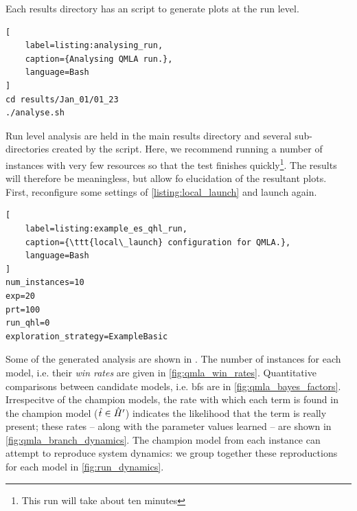 Each results directory has an  script to generate plots at the \gls{run} level. 
\begin{lstlisting}[
    label=listing:analysing_run,
    caption={Analysing QMLA run.},
    language=Bash
]
cd results/Jan_01/01_23
./analyse.sh
\end{lstlisting}

Run level analysis are held in the main results directory and several sub-directories created by the  script. 
Here, we recommend running a number of instances with very few resources so that the test finishes quickly\footnote{This run will take about ten minutes}. 
The results will therefore be meaningless, but allow fo elucidation of the resultant plots. 
First, reconfigure some settings of \cref{listing:local_launch} and launch again.
\begin{lstlisting}[
    label=listing:example_es_qhl_run,
    caption={\ttt{local\_launch} configuration for QMLA.},
    language=Bash
]
num_instances=10
exp=20
prt=100
run_qhl=0
exploration_strategy=ExampleBasic
\end{lstlisting}
\par 

Some of the generated analysis are shown in . 
The number of instances for each model, i.e. their \emph{\glspl{win rate}} are given in \cref{fig:qmla_win_rates}.
Quantitative comparisons between candidate models, i.e. \glspl{bf} are in \cref{fig:qmla_bayes_factors}.
Irrespecitve of the champion models, the rate with which each term is found in the champion model ($\hat{t} \in \hat{H}^{\prime}$)
    indicates the likelihood that the term is really present;
    these rates -- along with the parameter values learned -- are shown in \cref{fig:qmla_branch_dynamics}.
The champion model from each instance can attempt to reproduce system dynamics: 
    we group together these reproductions for each model in \cref{fig:run_dynamics}. 


